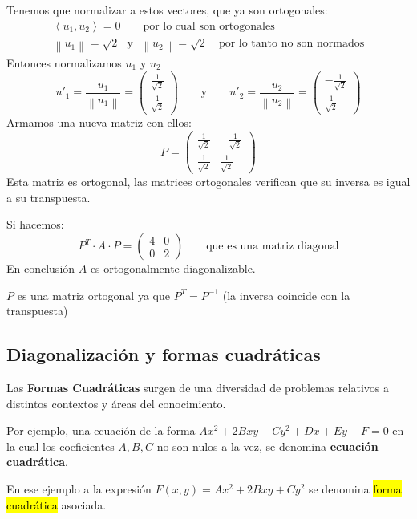Tenemos que normalizar a estos vectores, que ya son ortogonales:
\begin{align*}
  \left\langle u_1, u_2\right\rangle = 0 \qquad \text{por lo cual son ortogonales} \\  
  \left\lVert u_1\right\rVert = \sqrt{2} ~~~ \text{y} ~~~ \left\lVert u_2\right\rVert = \sqrt{2} \quad \text{por lo tanto no son normados}  
\end{align*}
Entonces normalizamos \(u_1\) y \(u_2\)
\[
u'_1 = \frac{u_1}{\left\lVert u_1\right\rVert } = \begin{pmatrix}
  \frac{1}{\sqrt{2}} \\ \frac{1}{\sqrt{2}}
\end{pmatrix} \qquad \text{y} \qquad u'_2 = \frac{u_2}{\left\lVert u_2\right\rVert } = \begin{pmatrix}
  -\frac{1}{\sqrt{2}} \\ \frac{1}{\sqrt{2}}
\end{pmatrix}
\]
Armamos una nueva matriz con ellos:
\[
  P = \begin{pmatrix}
    \frac{1}{\sqrt{2}} & -\frac{1}{\sqrt{2}} \\
    \frac{1}{\sqrt{2}} & \frac{1}{\sqrt{2}}
  \end{pmatrix}
\]
Esta matriz es ortogonal, las matrices ortogonales verifican que su inversa es igual a su transpuesta.

Si hacemos:
\[
  P^T \cdot A \cdot P = \begin{pmatrix}
    4 & 0 \\
    0 & 2
  \end{pmatrix} \qquad \text{que es una matriz diagonal}
\]
En conclusión \(A\) es ortogonalmente diagonalizable.

\(P\) es una matriz ortogonal ya que \(P^T = P^{-1}\) (la inversa coincide con la transpuesta)

\subsection{Diagonalización y formas cuadráticas}

Las \textbf{Formas Cuadráticas} surgen de una diversidad de problemas relativos a distintos contextos y áreas del conocimiento.

Por ejemplo, una ecuación de la forma \(Ax^2+2Bxy+Cy^2+Dx+Ey+F = 0\) en la cual los coeficientes \(A,B,C\) no son nulos a la vez, se denomina \textbf{ecuación cuadrática}.

En ese ejemplo a la expresión \(F(x,y) = Ax^2 + 2Bxy + Cy^2\) se denomina \hl{forma cuadrática} asociada.

